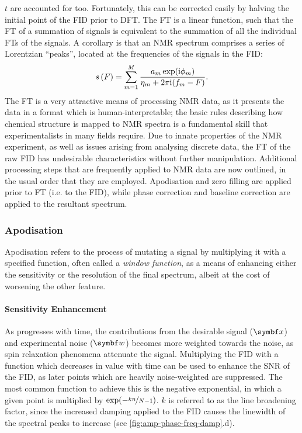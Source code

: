 $t$ are accounted for too. Fortunately, this can be corrected easily by
halving the initial point of the \ac{FID} prior to \ac{DFT}\cite{Tang1994}.
The \ac{FT} is a linear function, such that the
\ac{FT} of a summation of signals is equivalent to the summation of all
the individual \ac{FT}s of the signals. A corollary is that an \ac{NMR}
spectrum comprises a series of Lorentzian ``peaks'', located at the frequencies
of the signals in the \ac{FID}:
\begin{equation}
    s\left(F\right) = \sum_{m=1}^{M}
    \frac{\amexpphim}
    {\eta_m + 2 \pi \iu (f_m - F)}.
    \label{eq:ft-summation}%
\end{equation}
The \ac{FT} is a very attractive means of processing \ac{NMR} data, as it
presents the data in a format which is human-interpretable; the basic
rules describing how chemical structure is mapped to \ac{NMR} spectra
is a fundamental skill that experimentalists in many fields
require\cite{Hore2015b}.
Due to innate properties of the \ac{NMR} experiment,
as well as issues arising from analysing discrete data, the \ac{FT} of
the raw \ac{FID} has undesirable
characteristics without further manipulation. Additional processing
steps that are frequently applied to \ac{NMR} data are now outlined, in the
usual order that they are employed. Apodisation and zero filling
are applied prior to \ac{FT} (i.e. to the \ac{FID}), while phase
correction and baseline correction are applied to the resultant spectrum.

\subsubsection{Apodisation}
Apodisation refers to the process of mutating a signal by multiplying it with a
specified function, often called a \emph{window function}\cite[Section
3.2.7]{Claridge2016}, as a means of enhancing either the sensitivity or the
resolution of the final spectrum, albeit at the cost of worsening the other
feature.

\paragraph{Sensitivity Enhancement} As  progresses with time, the
contributions from the desirable signal ($\bx$) and experimental noise ($\bw$)
becomes more weighted towards the noise, as spin relaxation phenomena attenuate
the signal.  Multiplying the \ac{FID} with a function which decreases in value
with time can be used to enhance the \ac{SNR} of the \ac{FID}, as later points
which are heavily noise-weighted are suppressed. The most common function to
achieve this is the negative exponential, in which a given point is multiplied
by $\exp(-\nicefrac{k n}{N - 1})$.  $k$ is referred to as the line broadening
factor, since the increased damping applied to the \ac{FID} causes the
linewidth of the spectral peaks to increase (see
\cref{fig:amp-phase-freq-damp}.d).


